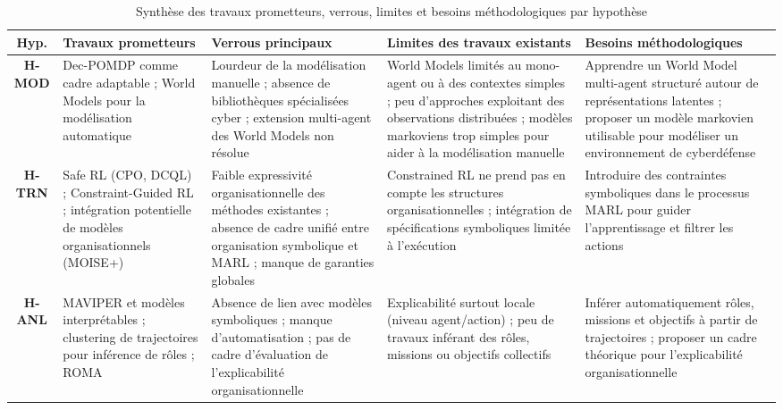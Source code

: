 \begin{table}[H]
  \centering
  \caption{Synthèse des travaux prometteurs, verrous, limites et besoins méthodologiques par hypothèse}
  \label{tab:synthese_hypotheses}
  \renewcommand{\arraystretch}{1.2}
  {%
    \footnotesize
    \begin{tabularx}{\textwidth}{cXXXX}
      \hline
      \textbf{Hyp.}
       & \textbf{Travaux prometteurs}
       & \textbf{Verrous principaux}
       & \textbf{Limites des travaux existants}
       & \textbf{Besoins méthodologiques}                                                                                                                                                                      \\
      \hline

      \textbf{H-MOD}
       & Dec-POMDP comme cadre adaptable ; World Models pour la modélisation automatique
       & Lourdeur de la modélisation manuelle ; absence de bibliothèques spécialisées cyber ; extension multi-agent des World Models non résolue
       & World Models limités au mono-agent ou à des contextes simples ; peu d’approches exploitant des observations distribuées ; modèles markoviens trop simples pour aider à la modélisation manuelle
       & Apprendre un World Model multi-agent structuré autour de représentations latentes ; proposer un modèle markovien utilisable pour modéliser un environnement de cyberdéfense                           \\
      \hline

      \textbf{H-TRN}
       & Safe RL (CPO, DCQL) ; Constraint-Guided RL ; intégration potentielle de modèles organisationnels (MOISE+)
       & Faible expressivité organisationnelle des méthodes existantes ; absence de cadre unifié entre organisation symbolique et MARL ; manque de garanties globales
       & Constrained RL ne prend pas en compte les structures organisationnelles ; intégration de spécifications symboliques limitée à l’exécution
       & Introduire des contraintes symboliques dans le processus MARL pour guider l’apprentissage et filtrer les actions                                                                                      \\
      \hline

      \textbf{H-ANL}
       & MAVIPER et modèles interprétables ; clustering de trajectoires pour inférence de rôles ; ROMA
       & Absence de lien avec modèles symboliques ; manque d’automatisation ; pas de cadre d’évaluation de l’explicabilité organisationnelle
       & Explicabilité surtout locale (niveau agent/action) ; peu de travaux inférant des rôles, missions ou objectifs collectifs
       & Inférer automatiquement rôles, missions et objectifs à partir de trajectoires ; proposer un cadre théorique pour l’explicabilité organisationnelle                                                    \\
      \hline


\end{tabularx}}
\end{table}
